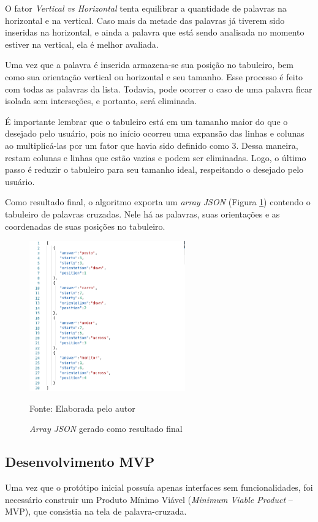 O fator \textit{Vertical vs Horizontal} tenta equilibrar a quantidade de palavras na horizontal e na vertical. Caso mais da metade das palavras já tiverem sido inseridas na horizontal, e ainda a palavra que está sendo analisada no momento estiver na vertical, ela é melhor avaliada.

Uma vez que a palavra é inserida armazena-se sua posição no tabuleiro, bem como sua orientação vertical ou horizontal e seu tamanho. Esse processo é feito com todas as palavras da lista. Todavia, pode ocorrer o caso de uma palavra ficar isolada sem interseções, e portanto, será eliminada. 

É importante lembrar que o tabuleiro está em um tamanho maior do que o desejado pelo usuário, pois no início ocorreu uma expansão das linhas e colunas ao multiplicá-las por um fator que havia sido definido como 3. Dessa maneira, restam colunas e linhas que estão vazias e podem ser eliminadas. Logo, o último passo é reduzir o tabuleiro para seu tamanho ideal, respeitando o desejado pelo usuário. 

Como resultado final, o algoritmo exporta um \textit{array JSON} (Figura \ref{fig:json}) contendo o tabuleiro de palavras cruzadas. Nele há as palavras, suas orientações e as coordenadas de suas posições no tabuleiro.

\begin{figure}[H]
\centering
    \caption{\textit{Array JSON} gerado como resultado final}
    \label{fig:json}
    \includegraphics[width=0.6\textwidth]{Figuras/codeJSONresult.png}
    
    Fonte: Elaborada pelo autor
\end{figure}

\subsection{Desenvolvimento MVP}
Uma vez que o protótipo inicial possuía apenas interfaces sem funcionalidades, foi necessário construir um Produto Mínimo Viável (\textit{Minimum Viable Product} -- MVP), que consistia na tela de palavra-cruzada.

